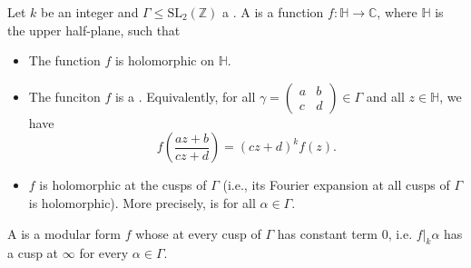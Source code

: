 \begin{definition} \label{definition:modular_form_and_cusp_form_of_weight_k_with_respect_to_a_congruence_subgroup_of_SL_2_Z}
Let $k$ be an integer and $\Gamma \leq \mathrm{SL}_2(\mathbb{Z})$ a . A  is a function $f : \mathbb{H} \to \mathbb{C}$, where $\mathbb{H}$ is the upper half-plane, such that 
\begin{itemize}
    \item The function $f$ is holomorphic on $\mathbb{H}$.
    \item The funciton $f$ is a . Equivalently, for all $\gamma = \begin{pmatrix} a & b \\ c & d \end{pmatrix}\in \Gamma$ and all $z \in \mathbb{H}$, we have
    $$ f\left( \frac{a z + b}{c z + d} \right) = (c z + d)^k f(z).  $$
    \item $f$ is holomorphic at the cusps of $\Gamma$ (i.e., its Fourier expansion at all cusps of $\Gamma$ is holomorphic). More precisely,  is  for all $\alpha \in \Gamma$.
\end{itemize}
A  is a modular form $f$ whose  at every cusp of $\Gamma$ has constant term $0$, i.e. $f|_k \alpha$ has a cusp at $\infty$ for every $\alpha \in \Gamma$.
\end{definition}